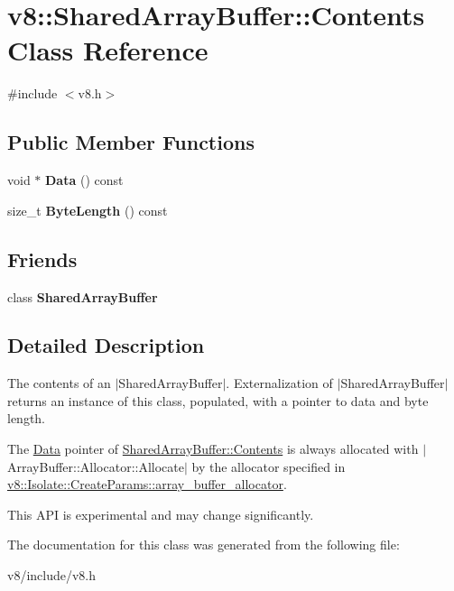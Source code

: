 \hypertarget{classv8_1_1SharedArrayBuffer_1_1Contents}{}\section{v8\+:\+:Shared\+Array\+Buffer\+:\+:Contents Class Reference}
\label{classv8_1_1SharedArrayBuffer_1_1Contents}


{\ttfamily \#include $<$v8.\+h$>$}

\subsection*{Public Member Functions}
\begin{DoxyCompactItemize}
\item 
\hypertarget{classv8_1_1SharedArrayBuffer_1_1Contents_a7e25a8f041d968fb7af4c4ae72dd2dc7}{}void $\ast$ {\bfseries Data} () const \label{classv8_1_1SharedArrayBuffer_1_1Contents_a7e25a8f041d968fb7af4c4ae72dd2dc7}

\item 
\hypertarget{classv8_1_1SharedArrayBuffer_1_1Contents_a68fb3080f3304278ec47c2cfddfec0ae}{}size\+\_\+t {\bfseries Byte\+Length} () const \label{classv8_1_1SharedArrayBuffer_1_1Contents_a68fb3080f3304278ec47c2cfddfec0ae}

\end{DoxyCompactItemize}
\subsection*{Friends}
\begin{DoxyCompactItemize}
\item 
\hypertarget{classv8_1_1SharedArrayBuffer_1_1Contents_a35ac2a80dda42f728b7b1dfc4c3cc040}{}class {\bfseries Shared\+Array\+Buffer}\label{classv8_1_1SharedArrayBuffer_1_1Contents_a35ac2a80dda42f728b7b1dfc4c3cc040}

\end{DoxyCompactItemize}


\subsection{Detailed Description}
The contents of an $\vert$\+Shared\+Array\+Buffer$\vert$. Externalization of $\vert$\+Shared\+Array\+Buffer$\vert$ returns an instance of this class, populated, with a pointer to data and byte length.

The \hyperlink{classv8_1_1Data}{Data} pointer of \hyperlink{classv8_1_1SharedArrayBuffer_1_1Contents}{Shared\+Array\+Buffer\+::\+Contents} is always allocated with $\vert$\+Array\+Buffer\+::\+Allocator\+::\+Allocate$\vert$ by the allocator specified in \hyperlink{structv8_1_1Isolate_1_1CreateParams_a7c663f70b64290392eeaf164f57585f9}{v8\+::\+Isolate\+::\+Create\+Params\+::array\+\_\+buffer\+\_\+allocator}.

This A\+P\+I is experimental and may change significantly. 

The documentation for this class was generated from the following file\+:\begin{DoxyCompactItemize}
\item 
v8/include/v8.\+h\end{DoxyCompactItemize}
